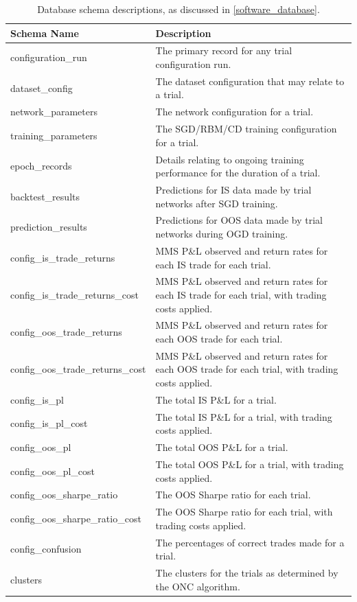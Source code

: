 \documentclass[a4paper,11pt,oneside]{article}
\theoremstyle{plain}
\theoremstyle{definition}
\begin{document}
	\begin{table}[H]
		\begin{tabular}{|p{0.33\linewidth}|p{0.67\linewidth}|}
			\hline
			\rowcolor{beaublue}
			\textbf{Schema Name} &\textbf{Description}  \\\hline	
			{configuration\_run} & {The primary record for any trial configuration run.} \\\hline
			{dataset\_config} & {The dataset configuration that may relate to a trial.} \\\hline
			{network\_parameters} & {The network configuration for a trial.} \\\hline
			{training\_parameters} & {The SGD/RBM/CD training configuration for a trial.}  \\\hline
			{epoch\_records} & {Details relating to ongoing training performance for the duration of a trial.}  \\\hline
			{backtest\_results} & {Predictions for IS data made by trial networks after SGD training.}  \\\hline
			{prediction\_results} & {Predictions for OOS data made by trial networks during OGD training.}  \\\hline
			{config\_is\_trade\_returns} & {MMS P\&L observed and return rates for each IS trade for each trial.}  \\\hline
			{config\_is\_trade\_returns\_cost} & {MMS P\&L observed and return rates for each IS trade for each trial, with trading costs applied.}  \\\hline
			{config\_oos\_trade\_returns} & {MMS P\&L observed and return rates for each OOS trade for each trial.}  \\\hline
			{config\_oos\_trade\_returns\_cost} & {MMS P\&L observed and return rates for each OOS trade for each trial, with trading costs applied.}  \\\hline
			{config\_is\_pl} & {The total IS P\&L for a trial.}  \\\hline
			{config\_is\_pl\_cost} & {The total IS P\&L for a trial, with trading costs applied.}  \\\hline
			{config\_oos\_pl} & {The total OOS P\&L for a trial.}  \\\hline
			{config\_oos\_pl\_cost} & {The total OOS P\&L for a trial, with trading costs applied.}  \\\hline
			{config\_oos\_sharpe\_ratio} & {The OOS Sharpe ratio for each trial.}  \\\hline
			{config\_oos\_sharpe\_ratio\_cost} & {The OOS Sharpe ratio for each trial, with trading costs applied.}  \\\hline			
			{config\_confusion} & {The percentages of correct trades made for a trial.}  \\\hline
			{clusters} & {The clusters for the trials as determined by the ONC algorithm.}  \\\hline
		\end{tabular}
		\newline\newline
		\caption{Database schema descriptions, as discussed in \ref{software_database}.}\label{tab_schemas}
	\end{table}
	
\end{document}
